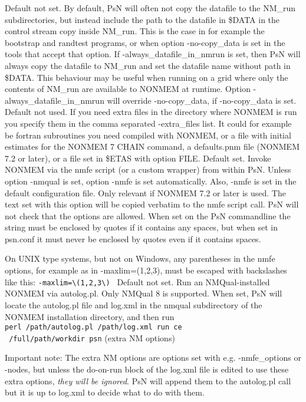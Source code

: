 \begin{optionlist}
Default not set. By default, PsN will often not copy the datafile to the NM\_run subdirectories, but instead include the path to the datafile in \$DATA in the control stream copy inside NM\_run. This is the case in for example the bootstrap and randtest programs, or when option -no-copy\_data is set in the tools that accept that option. If -always\_datafile\_in\_nmrun is set, then PsN will always copy the datafile to NM\_run and set the datafile name without path in \$DATA. This behaviour may be useful when running on a grid where only the contents of NM\_run are available to NONMEM at runtime. Option -always\_datafile\_in\_nmrun will override -no-copy\_data, if -no-copy\_data is set.
\nextopt
{}
Default not used. If you need extra files in the directory where NONMEM is run you specify them in the comma separated -extra\_files list. It could for example be fortran subroutines you need compiled with NONMEM, or a file with initial estimates for the NONMEM 7 CHAIN command, a defaults.pnm file (NONMEM 7.2 or later), or a file set in \$ETAS with option FILE. 
\nextopt
{}
Default set. Invoke NONMEM via the nmfe script (or a custom wrapper) from within PsN.  Unless option -nmqual is set, option -nmfe is 
set automatically. Also, -nmfe is set in the default configuration file.
\nextopt
{}
Only relevant if NONMEM 7.2 or later is used. The text set with this option will be copied verbatim to the nmfe script call. 
PsN will not check that the options are allowed. When set on the PsN commandline the string must be enclosed by quotes if it contains any spaces, but when set in psn.conf it must never be enclosed by quotes even if it contains spaces. 

On UNIX type systems, but not on Windows, any parentheses in the nmfe options, for example as in -maxlim=(1,2,3), must be
escaped with backslashes like this: \verb|-maxlim=\(1,2,3\) |
\nextopt
{}
Default not set. Run an NMQual-installed NONMEM via autolog.pl. Only NMQual 8 is supported. When set, PsN will locate the autolog.pl file and log.xml in the nmqual subdirectory of the NONMEM installation directory, and then run \\
\verb|perl /path/autolog.pl /path/log.xml run ce|\\
\verb| /full/path/workdir psn| (extra NM options)

Important note: The extra NM options are options set with e.g. -nmfe\_options or -nodes, but unless the do-on-run block of the log.xml file is edited to use these extra options, \emph{they will be ignored}. PsN will append them to the autolog.pl call but it is up to log.xml to decide what to do with them.


\end{optionlist}
